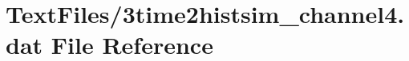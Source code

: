 \hypertarget{3time2histsim__channel4_8dat}{}\section{Text\+Files/3time2histsim\+\_\+channel4.dat File Reference}
\label{3time2histsim__channel4_8dat}
